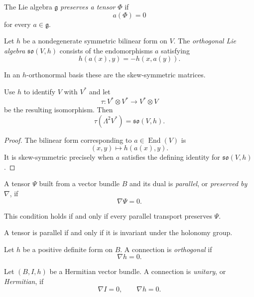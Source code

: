 \begin{definition}
\label{definition-lie-preserves-tensor}
The Lie algebra $\mathfrak{g}$
{\it preserves a tensor} $\Phi$ if
$$
a(\Phi)=0
$$
for every $a\in\mathfrak{g}$.
\end{definition}

\begin{definition}
\label{definition-orthogonal-lie-algebra}
Let $h$ be a nondegenerate symmetric
bilinear form on $V$. The
{\it orthogonal Lie algebra}
$\mathfrak{so}(V,h)$ consists of the
endomorphisms $a$ satisfying
$$
h(a(x),y)=-h(x,a(y)).
$$
\end{definition}

In an $h$-orthonormal basis these are the
skew-symmetric matrices.

\begin{proposition}
\label{proposition-two-forms-so}
Use $h$ to identify $V$ with $V^*$ and let
$$
\tau:V^*\otimes V^*
\longrightarrow V^*\otimes V
$$
be the resulting isomorphism. Then
$$
\tau(\Lambda^2V^*)
=\mathfrak{so}(V,h).
$$
\end{proposition}

\begin{proof}
The bilinear form corresponding to
$a\in\operatorname{End}(V)$ is
$$
(x,y)\longmapsto h(a(x),y).
$$
It is skew-symmetric precisely when $a$
satisfies the defining identity for
$\mathfrak{so}(V,h)$.
\end{proof}

\begin{definition}
\label{definition-parallel-tensor}
A tensor $\Psi$ built from a vector bundle
$B$ and its dual is {\it parallel}, or
{\it preserved by $\nabla$}, if
$$
\nabla\Psi=0.
$$
\end{definition}

This condition holds if and only if every
parallel transport preserves $\Psi$.

\begin{corollary}
\label{lemma-parallel-holonomy}
A tensor is parallel if and only if it is
invariant under the holonomy group.
\end{corollary}

\begin{definition}
\label{definition-orthogonal-connection}
Let $h$ be a positive definite form on $B$.
A connection is {\it orthogonal} if
$$
\nabla h=0.
$$
\end{definition}

\begin{definition}
\label{definition-unitary-connection}
Let $(B,I,h)$ be a Hermitian vector bundle.
A connection is {\it unitary}, or
{\it Hermitian}, if
$$
\nabla I=0,
\qquad
\nabla h=0.
$$
\end{definition}

